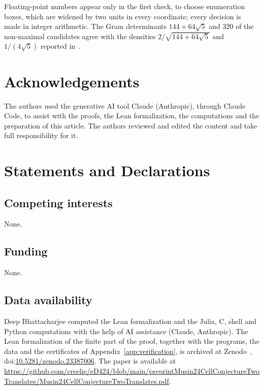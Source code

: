 \documentclass[11pt]{amsart}
\theoremstyle{definition}
\theoremstyle{remark}
\numberwithin{equation}{section}
\numberwithin{table}{section}
\numberwithin{figure}{section}
\newcommand{\zenodoID}{10.5281/zenodo.23387006}
\newcommand{\preprintURL}{https://github.com/creelie/eD424/blob/main/preprintMusin24CellConjectureTwoTranslates/Musin24CellConjectureTwoTranslates.pdf}
\begin{document}
Floating-point numbers appear only in the first check, to choose enumeration boxes, which are widened by two units in every coordinate; every decision is made in integer arithmetic. The Gram determinants $144+64\sqrt5$ and $320$ of the non-maximal candidates agree with the densities $2/\sqrt{144+64\sqrt5}$ and $1/(4\sqrt5)$ reported in~\cite[\S4.2]{AK2020}.

\section*{Acknowledgements}

The authors used the generative AI tool Claude (Anthropic), through Claude Code, to assist with the proofs, the Lean formalization, the computations and the preparation of this article. The authors reviewed and edited the content and take full responsibility for it.

\section*{Statements and Declarations}

\subsection*{Competing interests} None.

\subsection*{Funding} None.

\subsection*{Data availability} {\raggedright Deep Bhattacharjee computed the Lean formalization and the Julia, C, shell and Python computations with the help of AI assistance (Claude, Anthropic). The Lean formalization of the finite part of the proof, together with the programs, the data and the certificates of Appendix~\ref{app:verification}, is archived at Zenodo~\cite{Bhattacharjee2026}, doi:\href{https://doi.org/\zenodoID}{\zenodoID}. The paper is available at \url{\preprintURL}.\par}
\end{document}
